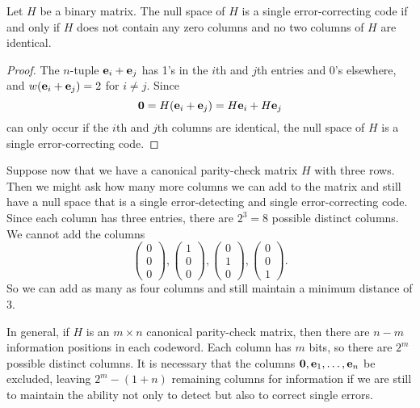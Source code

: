  
\begin{theorem}
Let $H$ be a binary matrix. The null space of $H$ is a single
error-correcting code if and only if $H$ does not contain any zero
columns and no two columns of $H$ are identical.
\end{theorem}
 
 
\begin{proof}
The $n$-tuple ${\bold e}_{i} +{\bold e}_{j}$ has 1's in the $i$th and
$j$th entries and 0's elsewhere, and $w( {\bold e}_{i} +{\bold
e}_{j}) = 2$ for $i \neq j$. Since
\[
{\bold 0}
= H({\bold e}_{i} +{\bold e}_{j})
= H{\bold e}_{i} + H{\bold e}_{j}
\]
can only occur if the $i$th and $j$th columns are identical, the
null space of $H$ is a single error-correcting code.
\end{proof}
 
 
\vspace{2ex}
 
 
Suppose now that we have a canonical parity-check matrix $H$ with
three rows. Then we might ask how many more columns we can add to
the matrix and still have a null space that is a single
error-detecting and single error-correcting code. Since each column
has three entries, there are $2^3 = 8$ possible distinct columns. We
cannot add the columns 
\[
\left(
\begin{array}{c} 0 \\ 0 \\ 0 \end{array}
\right),
\left(
\begin{array}{c} 1 \\ 0 \\ 0 \end{array}
\right),
\left(
\begin{array}{c} 0 \\ 1 \\ 0 \end{array}
\right),
\left(
\begin{array}{c} 0 \\ 0 \\ 1 \end{array}
\right).
\]
So we can add as many as four columns and still maintain a minimum
distance of 3. 
 
 
In general, if $H$ is an $m \times n$ canonical parity-check matrix,
then there are $n-m$ information positions in each codeword. Each
column has $m$ bits, so there are $2^m$ possible distinct columns.
It is necessary that the columns ${\bold 0}, {\bold e}_1, \ldots,
{\bold e}_n$ be excluded, leaving $2^m - (1 + n)$ remaining columns for
information if we are still to maintain the ability not only to detect
but also to correct single errors. 
 
